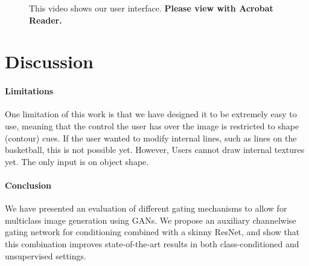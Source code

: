 \begin{figure}
	\centering
	\caption{This video shows our user interface. \textbf{Please view with Acrobat Reader.}}
\end{figure}

\section{Discussion}

\paragraph{Limitations}
One limitation of this work is that we have designed it to be extremely easy to use, meaning that the control the user has over the image is restricted to shape (contour) cues. 
If the user wanted to modify internal lines, such as lines on the basketball, this is not possible yet. 
However, Users cannot draw internal textures yet. The only input is on object shape.

\paragraph{Conclusion}
We have presented an evaluation of different gating mechanisms to allow for multiclass image generation using GANs. 
We propose an auxiliary channelwise gating network for conditioning combined with a skinny ResNet, and show that this combination improves state-of-the-art results in both class-conditioned and unsupervised settings.



